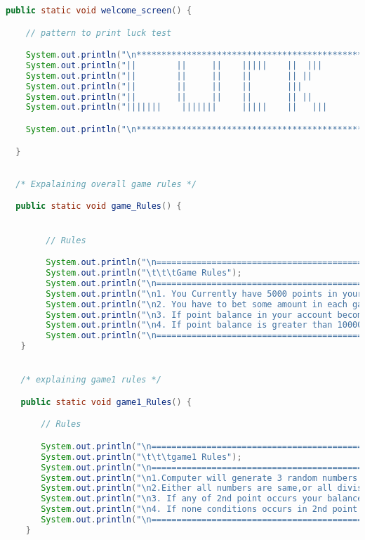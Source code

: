 \documentclass[]{article}
\begin{document}
\begin{lstlisting}[language=Java]
 public static void welcome_screen() {

    // pattern to print luck test

    System.out.println("\n***********************************************************************************************\n");
    System.out.println("||        ||     ||    |||||    ||  |||        ||||||||    ||||||   |||||||   ||||||||");
    System.out.println("||        ||     ||    ||       || ||             ||       ||       ||           ||   ");
    System.out.println("||        ||     ||    ||       |||               ||       |||||      |||        ||   ");
    System.out.println("||        ||     ||    ||       || ||             ||       ||            ||      ||   ");
    System.out.println("|||||||    |||||||     |||||    ||   |||          ||       ||||||   |||||||      ||   ");

    System.out.println("\n***********************************************************************************************\n");

  }
        

  /* Expalaining overall game rules */

  public static void game_Rules() {


        // Rules

        System.out.println("\n=====================================================================\n");
        System.out.println("\t\t\tGame Rules");
        System.out.println("\n======================================================================");
        System.out.println("\n1. You Currently have 5000 points in your game account.");
        System.out.println("\n2. You have to bet some amount in each game and you gain or loose");
        System.out.println("\n3. If point balance in your account becomes zero, then it is game over");
        System.out.println("\n4. If point balance is greater than 10000, you win");
        System.out.println("\n===================================================================\n");
   }


   /* explaining game1 rules */

   public static void game1_Rules() {

       // Rules

       System.out.println("\n=======================================================================\n"); 
       System.out.println("\t\t\tgame1 Rules");
       System.out.println("\n=========================================================================");
       System.out.println("\n1.Computer will generate 3 random numbers.");
       System.out.println("\n2.Either all numbers are same,or all divisible by 2 ");
       System.out.println("\n3. If any of 2nd point occurs your balance amount gets 5 times");
       System.out.println("\n4. If none conditions occurs in 2nd point occurs,then loose betted amount");
       System.out.println("\n=======================================================================\n"); 
    }


\end{lstlisting}
\end{document}
